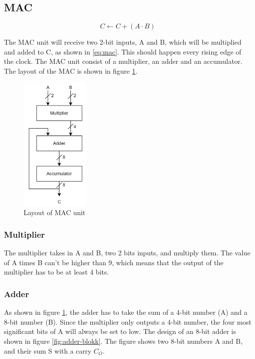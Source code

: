 \subsection{MAC}
\label{subsec:MAC_theory}

\begin{equation}
    \label{eq:mac}
    C \leftarrow C + (A \cdot B)
\end{equation}

The MAC unit will receive two 2-bit inputs, A and B, which will be multiplied and added to C, as shown in \ref{eq:mac}. This should happen every rising edge of the clock. The MAC unit consist of a multiplier, an adder and an accumulator. The layout of the MAC is shown in figure \ref{fig:mac-blokk}. 

\begin{figure}[htpb]
    \centering
    \includegraphics[width=0.3\textwidth]{Figures/mac-blokk.png}
    \caption{Layout of MAC unit}
    \label{fig:mac-blokk}
\end{figure}

\subsubsection{Multiplier}
The multiplier takes in A and B, two 2 bits inputs, and multiply them. The value of A times B can't be higher than 9, which means that the output of the multiplier has to be at least 4 bits. 

\subsubsection{Adder}
As shown in figure \ref{fig:mac-blokk}, the adder has to take the sum of a 4-bit number (A) and a 8-bit number (B). Since the multiplier only outputs a 4-bit number, the four most significant bits of A will always be set to low. The design of an 8-bit adder is shown in figure \ref{fig:adder-blokk}. The figure shows two 8-bit numbers A and B, and their sum S with a carry $C_O$. 


